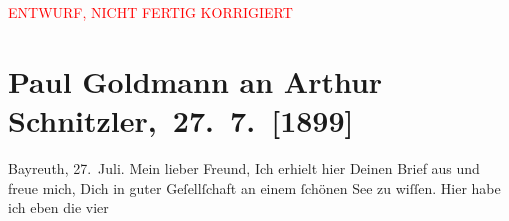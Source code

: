 
\begin{center}
            \textcolor{red}{ENTWURF, NICHT FERTIG KORRIGIERT}
                      \end{center}
            
         
         \renewcommand{\erwaehntePersonen}{Personen: Richard Beer-Hofmann, Alfred Dreyfus, Fedor Mamroth, Richard Wagner, Cosima Wagner}
         \renewcommand{\erwaehnteInstitutionen}{Institutionen: Bayreuther Festspiele}
         \renewcommand{\erwaehnteOrte}{Orte: Bayreuth, Deutschland, Grönland, Italien, Rennes, Velden am Wörthersee, Villach, Wörthersee}
         \renewcommand{\erwaehnteWerke}{Werke: Der Ring des Nibelungen}
               \section[ Paul Goldmann an Arthur Schnitzler, 27. 7. {[}1899{]}]{ Paul Goldmann an Arthur Schnitzler, 27. 7. {[}1899{]}}\nopagebreak{}\rehead{ }\begin{ledgroupsized}[t]{13cm}\normalsize\beginnumbering \toendnotes[C]{\smallbreak\pagebreak[2]} 
\toendnotes[C]{\smallbreak}\pstart
           \raggedleft{}{\pb}Bayreuth, 27. Juli.\pend
           \pstart\center{}Mein lieber Freund,\pend\pstart
           Ich erhielt hier Deinen Brief aus \label{K_L02881-1v}\label{K_L02881-1h} und freue mich, Dich in guter
               Geſellſchaft an einem ſchönen See zu wiſſen.\pend
           \pstart
           Hier habe ich eben die vier

\end{ledgroupsized}
